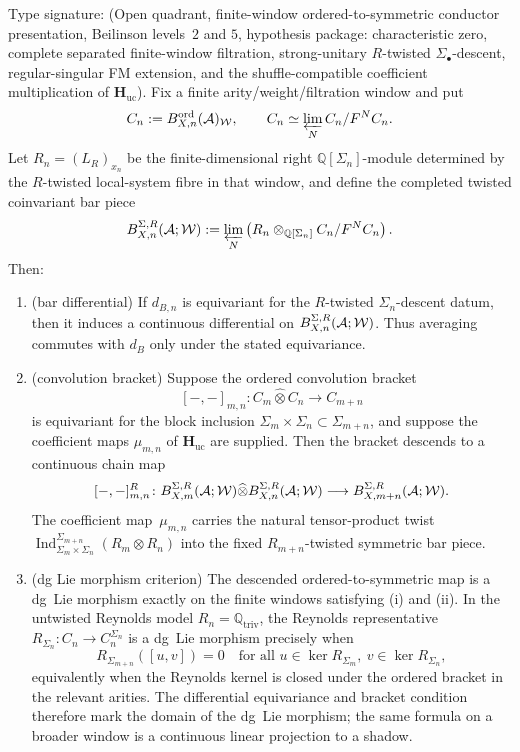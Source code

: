 \begin{theorem}
\label{thm:uc-r-twisted-dg-lie-descent}
\ClaimStatusProvedHere
{}
Type signature: \textup{(}Open quadrant, finite-window
ordered-to-symmetric conductor presentation, Beilinson levels~$2$ and
$5$, hypothesis package: characteristic zero, complete separated
finite-window filtration, strong-unitary \(R\)-twisted
\(\Sigma_\bullet\)-descent, regular-singular FM extension, and the
shuffle-compatible coefficient multiplication of
\(\mathbf H_{\mathrm{uc}}\)\textup{)}.
Fix a finite arity/weight/filtration window and put
\[
C_n:=B^{\mathrm{ord}}_{X,n}(\mathcal{A})_{\mathcal W},\qquad
C_n\simeq\varprojlim_N C_n/F^N C_n .
\]
Let \(R_n=(L_R)_{x_n}\) be the finite-dimensional right
\(\mathbb Q[\Sigma_n]\)-module determined by the \(R\)-twisted
local-system fibre in that window, and define the completed twisted
coinvariant bar piece
\[
B^{\Sigma,R}_{X,n}(\mathcal{A};\mathcal W)
:=
\varprojlim_N
\left(
R_n\otimes_{\mathbb Q[\Sigma_n]} C_n/F^N C_n
\right).
\]
Then:
\begin{enumerate}[label=\textup{(\roman*)}]
\item \textup{(bar differential)}
If \(d_{B,n}\) is equivariant for the \(R\)-twisted
\(\Sigma_n\)-descent datum, then it induces a continuous differential
on \(B^{\Sigma,R}_{X,n}(\mathcal{A};\mathcal W)\).  Thus averaging commutes
with \(d_B\) only under the stated equivariance.
\item \textup{(convolution bracket)}
Suppose the ordered convolution bracket
\[
[-,-]_{m,n}\colon
C_m\widehat\otimes C_n\longrightarrow C_{m+n}
\]
is equivariant for the block inclusion
\(\Sigma_m\times\Sigma_n\subset\Sigma_{m+n}\), and suppose the
coefficient maps \(\mu_{m,n}\) of
\(\mathbf H_{\mathrm{uc}}\) are supplied.  Then the bracket descends to
a continuous chain map
\[
[-,-]^{R}_{m,n}\colon
B^{\Sigma,R}_{X,m}(\mathcal{A};\mathcal W)
\widehat\otimes
B^{\Sigma,R}_{X,n}(\mathcal{A};\mathcal W)
\longrightarrow
B^{\Sigma,R}_{X,m+n}(\mathcal{A};\mathcal W).
\]
The coefficient map~\(\mu_{m,n}\) carries the natural tensor-product
twist
\(\operatorname{Ind}_{\Sigma_m\times\Sigma_n}^{\Sigma_{m+n}}
(R_m\otimes R_n)\) into the fixed \(R_{m+n}\)-twisted symmetric
bar piece.
\item \textup{(dg Lie morphism criterion)}
The descended ordered-to-symmetric map is a dg~Lie morphism exactly on
the finite windows satisfying \textup{(i)} and \textup{(ii)}.  In the
untwisted Reynolds model \(R_n=\mathbb Q_{\mathrm{triv}}\), the
Reynolds representative
\(R_{\Sigma_n}\colon C_n\to C_n^{\Sigma_n}\) is a dg~Lie morphism
precisely when
\[
R_{\Sigma_{m+n}}([u,v])=0
\quad
\text{for all }
u\in\ker R_{\Sigma_m},\ v\in\ker R_{\Sigma_n},
\]
equivalently when the Reynolds kernel is closed under the ordered
bracket in the relevant arities.  The differential equivariance and
bracket condition therefore mark the domain of the dg~Lie morphism;
the same formula on a broader window is a continuous linear projection
to a shadow.
\end{enumerate}
\end{theorem}


